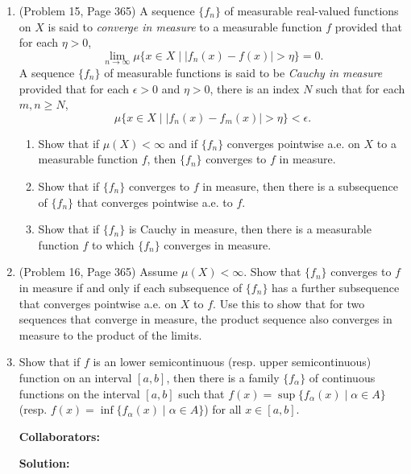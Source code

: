\documentclass{article}%
\begin{document}
\begin{enumerate}
\item  (Problem 15, Page 365)  A sequence $\{f_n\}$ of measurable real-valued functions on $X$ is said to \emph{converge in measure} to a measurable function $f$  provided that for each $\eta > 0$, \[
\lim_{n\to \infty} \mu\{x\in X \mid |f_n(x) - f(x)|>\eta \} = 0.\]A sequence $\{f_n\}$ of measurable functions is said to be \emph{Cauchy in measure} provided that for each $\epsilon > 0$ and $\eta > 0$, there is an index $N$ such that for each $m,n\geq N$, \[
\mu\{x\in X \mid |f_n(x) - f_m(x)| > \eta \} < \epsilon.\]
\begin{enumerate}
\item Show that if $\mu(X)< \infty$ and if $\{f_n\}$ converges pointwise a.e. on $X$ to a measurable function $f$, then $\{f_n\}$ converges to $f$ in measure.
\item Show that if $\{f_n\}$ converges to $f$ in measure, then there is a subsequence of $\{f_n\}$ that converges pointwise a.e. to $f$.
\item Show that if $\{f_n\}$ is Cauchy in measure, then there is a measurable function $f$ to which $\{f_n\}$ converges in measure.\end{enumerate}

\item (Problem 16, Page 365) Assume $\mu (X) < \infty$.  Show that $\{f_n\}$ converges to $f$ in measure if and only if each  subsequence of $\{f_n\}$ has a further subsequence that converges pointwise a.e. on $X$ to $f$.  Use this to show that for two sequences that converge in measure, the product sequence also converges in measure to the product of the limits. 

\item Show that if $f$ is an lower semicontinuous (resp. upper semicontinuous) function on an interval $[a,b]$, then there is a family $\{f_{\alpha}\}$ of continuous functions on the interval $[a,b]$ such that $f(x) = \sup\{f_{\alpha}(x) \mid \alpha \in A \}$ (resp. $f(x) = \inf\{f_{\alpha}(x) \mid \alpha \in A \}$) for all $x \in [a,b]$.  


\bigskip
\textbf{Collaborators:}\\
\smallskip
 
\textbf{Solution:}
\bigskip






\end{enumerate}
\end{document}
